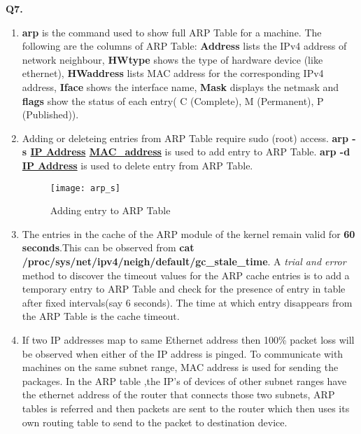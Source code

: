 \documentclass[12pt]{report}
\begin{document}
	\pagebreak
	\vspace*{10px}
	\large{\textbf{Q7.}}
	\linebreak[1]
	\normalsize{}
	\begin{enumerate}[label=\textbf{(\alph*)}]
		\item \textbf{arp} is the command used to show full ARP Table for a machine. The following are the columns of ARP Table: \textbf{Address} lists the IPv4 address of network neighbour, \textbf{HWtype} shows the type of hardware device (like ethernet), \textbf{HWaddress} lists MAC address for the corresponding IPv4 address, \textbf{Iface} shows the interface name, \textbf{Mask} displays the netmask and \textbf{flags} show the status of each entry( C (Complete), M (Permanent), P (Published)).

		\item Adding or deleteing entries from ARP Table require sudo (root) access. \textbf{arp -s \underline{IP Address} \underline{MAC\_address}} is used to add entry to ARP Table. \textbf{arp -d \underline{IP Address}} is used to delete entry from ARP Table.
		 \begin{figure}[H]
		 	\centering
		 	\texttt{[image: arp\_s]}
		 	\caption{Adding entry to ARP Table}
		 \end{figure}
	 
	 	\item The entries in the cache of the ARP module of the kernel remain valid for \textbf{60 seconds}.This can be observed from \textbf{cat /proc/sys/net/ipv4/neigh/default/gc\_stale\_time}. A \textit{trial and error} method to discover the timeout values for the ARP cache entries is to add a temporary entry to ARP Table and check for the presence of entry in table after fixed intervals(say 6 seconds). The time at which entry disappears from the ARP Table is the cache timeout.
	 	
	 	\item  If two IP addresses map to same Ethernet address then 100\% packet loss will be observed when either of the IP address is pinged. 
	 	To communicate with machines on the same subnet range, MAC address is used for sending the packages. In the ARP table ,the IP’s of devices of other subnet ranges have the ethernet address of the router that connects those two subnets, ARP tables is referred and then packets are sent to the router which then uses its own routing table to send to the packet to destination device.
	\end{enumerate}
	
\end{document}
